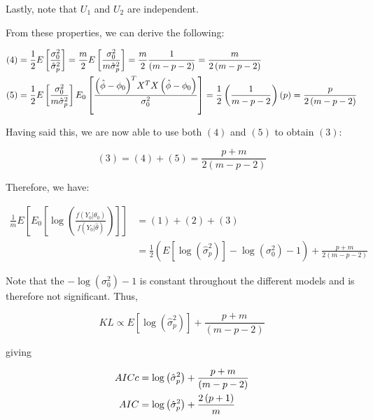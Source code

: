 \documentclass[]{book}
\theoremstyle{definition}
\theoremstyle{definition}
\theoremstyle{definition}
\theoremstyle{remark}
\begin{document}
{Lastly, note that \(U_1\) and \(U_2\) are independent.

From these properties, we can derive the following:

\begin{align*}
  \left( 4 \right) &= \frac{1}{2}E\left[ {\frac{{\sigma _0^2}}{{\hat \sigma _p^2}}} \right] = \frac{m}{2}E\left[ {\frac{{\sigma _0^2}}{{m\hat \sigma _p^2}}} \right] = \frac{m}{2}\frac{1}{{\left( {m - p - 2} \right)}} = \frac{m}{{2\left( {m - p - 2} \right)}} \hfill \\ 
    \left( 5 \right) &= \frac{1}{2}E\left[ {\frac{{\sigma _0^2}}{{m\hat \sigma _p^2}}} \right]{E_0}\left[ {\frac{{{{\left( {\hat \phi  - {\phi _0}} \right)}^T}{X^T}X\left( {\hat \phi  - {\phi _0}} \right)}}{{\sigma _0^2}}} \right] = \frac{1}{2}\left( {\frac{1}{{m - p - 2}}} \right)\left( p \right) = \frac{p}{{2\left( {m - p - 2} \right)}} \hfill \\
\end{align*}

Having said this, we are now able to use both \(\left( 4 \right)\) and
\(\left( 5 \right)\) to obtain \(\left( 3 \right)\):

\[\left( 3 \right) = \left( 4 \right) + \left( 5 \right) = \frac{{p + m}}{{2\left( {m - p - 2} \right)}}\]

Therefore, we have:

\begin{align*}
\frac{1}{m}E\left[ {{E_0}\left[ {\log \left( {\frac{{f\left( {{Y_0}|{\theta _0}} \right)}}{{f\left( {{Y_0}|\hat \theta } \right)}}} \right)} \right]} \right] &= \left( 1 \right) + \left( 2 \right) + \left( 3 \right) \\
&= \frac{1}{2}\left( {E\left[ {\log \left( {\hat \sigma _p^2} \right)} \right] - \log \left( {\sigma _0^2} \right) - 1} \right) + \frac{{p + m}}{{2\left( {m - p - 2} \right)}}
\end{align*}

Note that the \({ - \log \left( {\sigma _0^2} \right) - 1}\) is constant
throughout the different models and is therefore not significant. Thus,

\[KL \propto E\left[ {\log \left( {\hat \sigma _p^2} \right)} \right] + \frac{{p + m}}{{\left( {m - p - 2} \right)}}\]

giving

\begin{align*}
  AICc &= \log \left( {\hat \sigma _p^2} \right) + \frac{{p + m}}{{\left( {m - p - 2} \right)}} \hfill \\
  AIC &= \log \left( {\hat \sigma _p^2} \right) + \frac{{2\left( {p + 1} \right)}}{m} \hfill \\ 
\end{align*}

}
\end{document}
